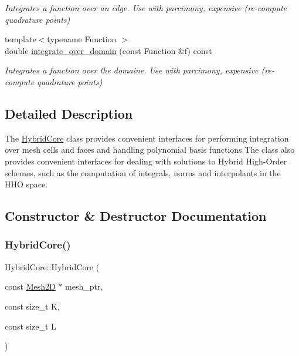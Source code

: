 \begin{DoxyCompactItemize}
\begin{DoxyCompactList}\small\item\em Integrates a function over an edge. Use with parcimony, expensive (re-\/compute quadrature points) \end{DoxyCompactList}\item 
{\footnotesize template$<$typename Function $>$ }\\double \hyperlink{group__HybridCore2D_gab058c4e54d1e33c49e537b8d0f602848}{integrate\+\_\+over\+\_\+domain} (const Function \&f) const
\begin{DoxyCompactList}\small\item\em Integrates a function over the domaine. Use with parcimony, expensive (re-\/compute quadrature points) \end{DoxyCompactList}\end{DoxyCompactItemize}


\subsection{Detailed Description}
The \hyperlink{classHArDCore2D_1_1HybridCore}{Hybrid\+Core} class provides convenient interfaces for performing integration over mesh cells and faces and handling polynomial basis functions The class also provides convenient interfaces for dealing with solutions to Hybrid High-\/\+Order schemes, such as the computation of integrals, norms and interpolants in the H\+HO space. 

\subsection{Constructor \& Destructor Documentation}
\mbox{\label{classHArDCore2D_1_1HybridCore_a77e1aad579b2b484f068790d546a8d77}} 
\subsubsection{\texorpdfstring{Hybrid\+Core()}{HybridCore()}}
{\footnotesize\ttfamily Hybrid\+Core\+::\+Hybrid\+Core (\begin{DoxyParamCaption}\item[{const \hyperlink{classHArDCore2D_1_1Mesh2D}{Mesh2D} $\ast$}]{mesh\+\_\+ptr,  }\item[{const size\+\_\+t}]{K,  }\item[{const size\+\_\+t}]{L }\end{DoxyParamCaption})}



